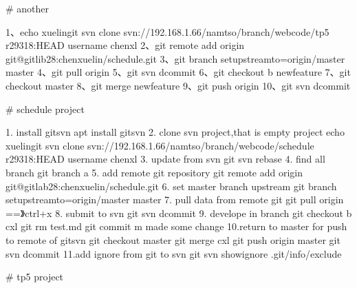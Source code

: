 \documentclass[a4paper,10pt,english]{sphinxmanual}
\begin{document}
\# another

\begin{sphinxVerbatim}[commandchars=\\\{\}]
1、echo xuelin\textbar{}git svn clone svn://192.168.1.66/namtso/branch/web\PYGZus{}code/tp5 \PYGZhy{}r29318:HEAD \PYGZhy{}\PYGZhy{}username chenxl
2、git remote add origin git@gitlib28:chenxuelin/schedule.git
3、git branch \PYGZhy{}\PYGZhy{}set\PYGZhy{}upstream\PYGZhy{}to=origin/master master
4、git pull origin
5、git svn dcommit
6、git checkout \PYGZhy{}b newfeature
7、git checkout master
8、git merge newfeature
9、git push origin
10、git svn dcommit
\end{sphinxVerbatim}

\# schedule project

\begin{sphinxVerbatim}[commandchars=\\\{\}]
1. install git\PYGZhy{}svn
   apt install git\PYGZhy{}svn
2. clone svn project,that is empty project
   echo xuelin\textbar{}git svn clone svn://192.168.1.66/namtso/branch/web\PYGZus{}code/schedule \PYGZhy{}r29318:HEAD \PYGZhy{}\PYGZhy{}username chenxl
3. update from svn
   git svn rebase
4. find all branch
   git branch \PYGZhy{}a
5. add remote git repository
   git remote add origin git@gitlab28:chenxuelin/schedule.git
6. set master branch upstream
   git branch \PYGZhy{}\PYGZhy{}set\PYGZhy{}upstream\PYGZhy{}to=origin/master master
7. pull data from remote git
   git pull origin ==》ctrl+x
8. submit to svn
   git svn dcommit
9. develope in branch
   git checkout \PYGZhy{}b \PYGZdq{}cxl\PYGZdq{}
   git rm test.md
   git commit \PYGZhy{}m \PYGZdq{}made some change\PYGZdq{}
10.return to master for push to remote of git\PYGZam{}svn
   git checkout master
   git merge cxl
   git push origin master
   git svn dcommit
11.add ignore from git to svn
   git svn show\PYGZhy{}ignore \PYGZgt{}\PYGZgt{} .git/info/exclude
\end{sphinxVerbatim}

\# tp5 project
\end{document}
